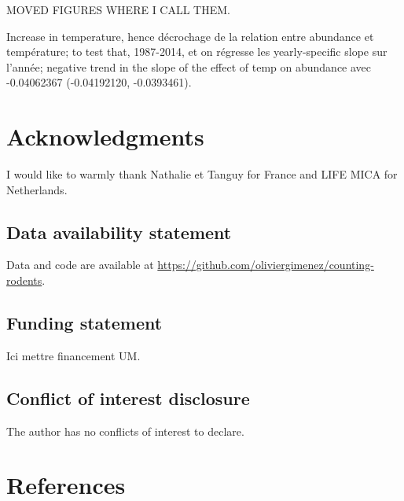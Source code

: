 \documentclass[
  11pt,
  a4paper,
]{article}
\begin{document}
MOVED FIGURES WHERE I CALL THEM.

Increase in temperature, hence décrochage de la relation entre abundance et température; to test that, 1987-2014, et on régresse les yearly-specific slope sur l'année; negative trend in the slope of the effect of temp on abundance avec -0.04062367 (-0.04192120, -0.0393461).

\section{Acknowledgments}\label{acknowledgments}

I would like to warmly thank Nathalie et Tanguy for France and LIFE MICA for Netherlands.

\subsection{Data availability statement}\label{data-availability-statement}

Data and code are available at \href{https://github.com/oliviergimenez/counting-rodents}{https://github.com/oliviergimenez/counting-rodents}.

\subsection{Funding statement}\label{funding-statement}

Ici mettre financement UM.

\subsection{Conflict of interest disclosure}\label{conflict-of-interest-disclosure}

The author has no conflicts of interest to declare.

\section{References}\label{references}
\end{document}
